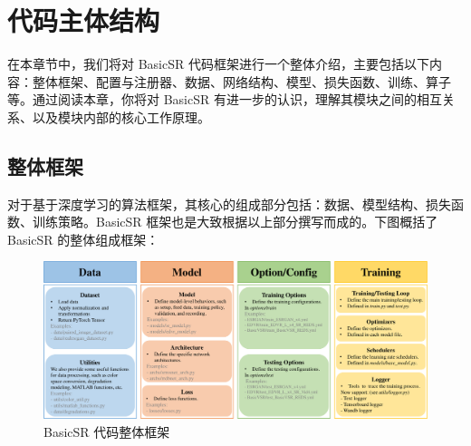 \documentclass[../main.tex]{subfiles}
\begin{document}
    \chapter{代码主体结构}
    \vspace{-2cm}

    在本章节中，我们将对 BasicSR 代码框架进行一个整体介绍，主要包括以下内容：整体框架、配置与注册器、数据、网络结构、模型、损失函数、训练、算子等。通过阅读本章，你将对 BasicSR 有进一步的认识，理解其模块之间的相互关系、以及模块内部的核心工作原理。


    \section{整体框架}
    对于基于深度学习的算法框架，其核心的组成部分包括：数据、模型结构、损失函数、训练策略。BasicSR 框架也是大致根据以上部分撰写而成的。下图概括了 BasicSR 的整体组成框架：

    \begin{figure}[htbp]
        \begin{center}
            \includegraphics[width=1\linewidth]{figures/main_framework.pdf}
        \end{center}
        \caption{BasicSR 代码整体框架}
        \label{fig:main_framework}

    \end{figure}
\end{document}
